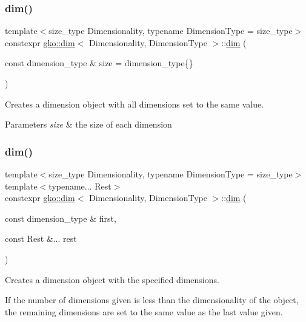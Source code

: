 \subsubsection{\texorpdfstring{dim()}{dim()}\hspace{0.1cm}{\footnotesize\ttfamily [1/2]}}
{\footnotesize\ttfamily template$<$size\+\_\+type Dimensionality, typename Dimension\+Type = size\+\_\+type$>$ \\
constexpr \hyperlink{structgko_1_1dim}{gko\+::dim}$<$ Dimensionality, Dimension\+Type $>$\+::\hyperlink{structgko_1_1dim}{dim} (\begin{DoxyParamCaption}\item[{const dimension\+\_\+type \&}]{size = {\ttfamily dimension\+\_\+type\{\}} }\end{DoxyParamCaption})}



Creates a dimension object with all dimensions set to the same value. 


\begin{DoxyParams}{Parameters}
{\em size} & the size of each dimension \\
\hline
\end{DoxyParams}
\mbox{\label{structgko_1_1dim_a09b90cec3c5778596ef75bed95ab8850}} 
\subsubsection{\texorpdfstring{dim()}{dim()}\hspace{0.1cm}{\footnotesize\ttfamily [2/2]}}
{\footnotesize\ttfamily template$<$size\+\_\+type Dimensionality, typename Dimension\+Type = size\+\_\+type$>$ \\
template$<$typename... Rest$>$ \\
constexpr \hyperlink{structgko_1_1dim}{gko\+::dim}$<$ Dimensionality, Dimension\+Type $>$\+::\hyperlink{structgko_1_1dim}{dim} (\begin{DoxyParamCaption}\item[{const dimension\+\_\+type \&}]{first,  }\item[{const Rest \&...}]{rest }\end{DoxyParamCaption})}



Creates a dimension object with the specified dimensions. 

If the number of dimensions given is less than the dimensionality of the object, the remaining dimensions are set to the same value as the last value given.

